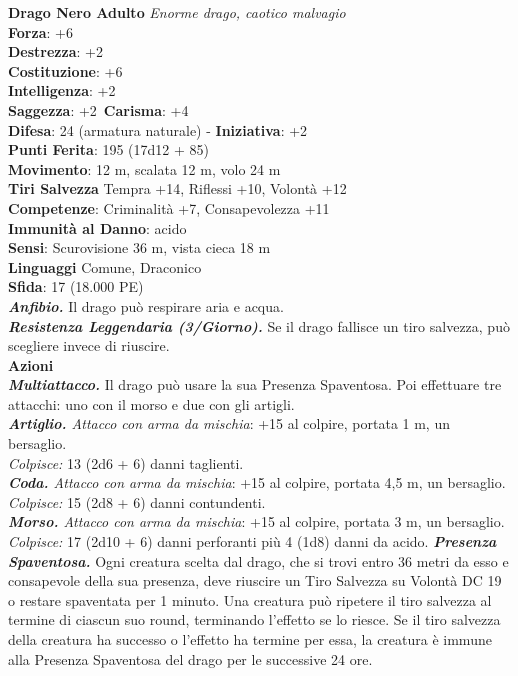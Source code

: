 \begin{multicols}{2}
\medskip\textbf{Drago Nero Adulto}
\emph{Enorme drago, caotico malvagio}\\
\textbf{Forza}: +6\\
\textbf{Destrezza}: +2\\
\textbf{Costituzione}: +6\\
\textbf{Intelligenza}: +2\\
\textbf{Saggezza}: +2\
\textbf{Carisma}: +4\\
\textbf{Difesa}: 24 (armatura naturale) - \textbf{Iniziativa}: +2\\
\textbf{Punti Ferita}: 195 (17d12 + 85)\\
\textbf{Movimento}: 12 m, scalata 12 m, volo 24 m\\
\textbf{Tiri Salvezza} Tempra +14, Riflessi +10, Volontà +12\\
\textbf{Competenze}: Criminalità +7, Consapevolezza +11\\
\textbf{Immunità al Danno}: acido\\
\textbf{Sensi}: Scurovisione 36 m, vista cieca 18 m\\
\textbf{Linguaggi} Comune, Draconico\\
\textbf{Sfida}: 17 (18.000 PE)\smallskip\\
\emph{\textbf{Anfibio.}} Il drago può respirare aria e acqua.\\
\emph{\textbf{Resistenza Leggendaria (3/Giorno).}} Se il drago fallisce un tiro salvezza, può scegliere invece di riuscire.\\
\smallskip\textbf{Azioni}\\
\emph{\textbf{Multiattacco.}} Il drago può usare la sua Presenza Spaventosa. Poi effettuare tre attacchi: uno con il morso e due con gli artigli.\\
\emph{\textbf{Artiglio.} Attacco con arma da mischia}: +15 al colpire, portata 1 m, un bersaglio.\\
\emph{Colpisce:} 13 (2d6 + 6) danni taglienti.\\
\emph{\textbf{Coda.} Attacco con arma da mischia}: +15 al colpire, portata 4,5 m, un bersaglio.\\
\emph{Colpisce:} 15 (2d8 + 6) danni contundenti. \\
\emph{\textbf{Morso.} Attacco con arma da mischia}: +15 al colpire, portata 3 m, un bersaglio.\\
\emph{Colpisce:} 17 (2d10 + 6) danni perforanti più 4 (1d8) danni da acido.
\emph{\textbf{Presenza Spaventosa.}} Ogni creatura scelta dal drago, che si trovi entro 36 metri da esso e consapevole della sua presenza, deve riuscire un Tiro Salvezza su Volontà DC  19 o restare spaventata per 1 minuto. Una creatura può ripetere il tiro salvezza al termine di ciascun suo round, terminando l'effetto se lo riesce. Se il tiro salvezza della creatura ha successo o l'effetto ha termine per essa, la creatura è immune alla Presenza Spaventosa del drago per le successive 24 ore.\\

\end{multicols}
